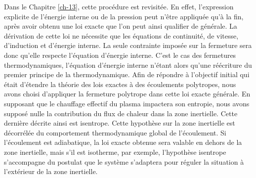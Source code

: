 Dans le Chapitre \ref{ch-13}, cette procédure est revisitée. En effet, l'expression explicite de l'énergie interne ou de la pression peut n'être appliquée qu'à la fin, après avoir obtenu une loi exacte que l'on peut ainsi qualifier de générale. La dérivation de cette loi ne nécessite que les équations de continuité, de vitesse, d'induction et d'énergie interne. La seule contrainte imposée sur la fermeture sera donc qu'elle respecte l'équation d'énergie interne. C'est le cas des fermetures thermodynamiques, l'équation d'énergie interne n'étant alors qu'une réécriture du premier principe de la thermodynamique. Afin de répondre à l'objectif initial qui était d'étendre la théorie des lois exactes à des écoulements polytropes, nous avons choisi d'appliquer la fermeture polytrope dans cette loi exacte générale. En supposant que le chauffage effectif du plasma impactera son entropie, nous avons supposé nulle la contribution du flux de chaleur dans la zone inertielle. Cette dernière décrite ainsi est isentrope. Cette hypothèse sur la zone inertielle est décorrélée du comportement thermodynamique global de l'écoulement. Si l'écoulement est adiabatique, la loi exacte obtenue sera valable en dehors de la zone inertielle, mais s'il est isotherme, par exemple, l'hypothèse isentrope s'accompagne du postulat que le système s'adaptera pour réguler la situation à l'extérieur de la zone inertielle. 

